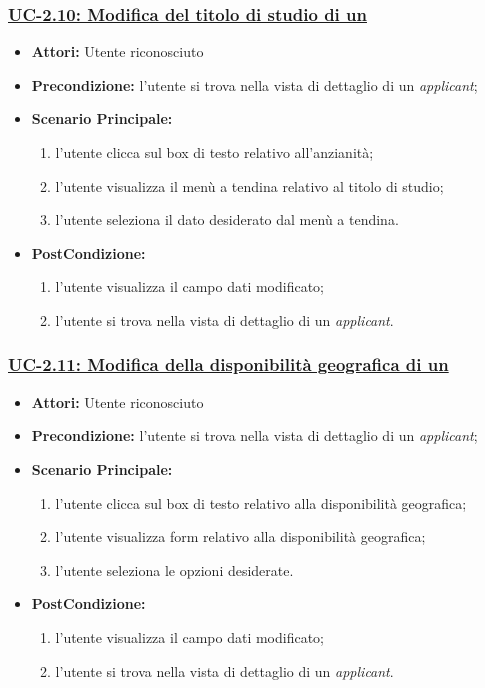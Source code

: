 \subsubsection{\underline{UC-2.10: Modifica del titolo di studio di un \applicant}}
\begin{itemize}
	\item \textbf{Attori:} Utente riconosciuto
	\item \textbf{Precondizione:}  l'utente si trova nella vista di dettaglio di un \textit{applicant};
	\item \textbf{Scenario Principale:}
	\begin{enumerate}
		\item l'utente clicca sul box di testo relativo all'anzianità;
		\item l'utente visualizza il menù a tendina relativo al titolo di studio;
		\item l'utente seleziona il dato desiderato dal menù a tendina.
	\end{enumerate}
	\item \textbf{PostCondizione:} 
	\begin{enumerate}
		\item l'utente visualizza il campo dati modificato;
		\item l'utente si trova nella vista di dettaglio di un \textit{applicant}.
	\end{enumerate}
	
\end{itemize}


\subsubsection{\underline{UC-2.11: Modifica della disponibilità geografica di un \applicant}}
\begin{itemize}
	\item \textbf{Attori:} Utente riconosciuto
	\item \textbf{Precondizione:}  l'utente si trova nella vista di dettaglio di un \textit{applicant};
	\item \textbf{Scenario Principale:}
	\begin{enumerate}
		\item l'utente clicca sul box di testo relativo alla disponibilità geografica;
		\item l'utente visualizza form relativo alla disponibilità geografica;
		\item l'utente seleziona le opzioni desiderate.
	\end{enumerate}
	\item \textbf{PostCondizione:} 
	\begin{enumerate}
		\item l'utente visualizza il campo dati modificato;
		\item l'utente si trova nella vista di dettaglio di un \textit{applicant}.
	\end{enumerate}
	
\end{itemize}

